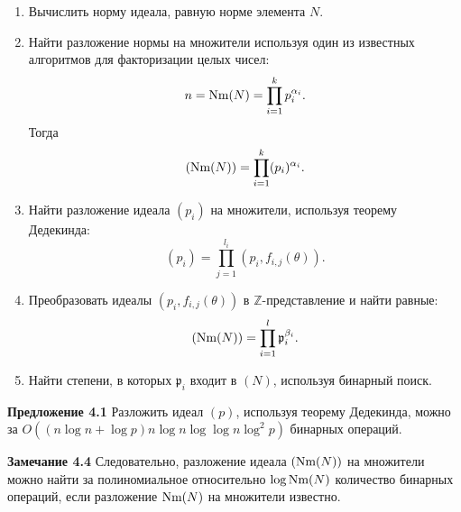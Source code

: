 \documentclass[_00_autoref.tex]{subfiles}
\begin{document}
    \begin{enumerate}        
        \item Вычислить норму идеала, равную норме элемента $N$.
        
        \item Найти разложение нормы на множители используя один из известных алгоритмов для факторизации целых чисел:
        \begin{equation*}
            n = \textrm{Nm}(N) = \prod_{i=1}^{k} p_i^{\alpha_i}.
        \end{equation*}
        Тогда
        \begin{equation*}
            (\textrm{Nm}(N)) = \prod_{i=1}^{k} (p_i)^{\alpha_i}.
        \end{equation*}
    
        \item Найти разложение идеала $(p_i)$ на множители, используя теорему Дедекинда:
        \begin{equation*}
            (p_i) = \prod_{j=1}^{l_i} (p_i, f_{i, j}(\theta)).
        \end{equation*}
    
        \item Преобразовать идеалы $(p_i, f_{i, j}(\theta))$ в $\mathbb{Z}$-представление и найти равные:
        \begin{equation*}
            (\textrm{Nm}(N)) = \prod_{i=1}^{l} \mathfrak{p}_i^{\beta_i}.
        \end{equation*}
    
        \item Найти степени, в которых $\mathfrak{p}_i$ входит в $(N)$, используя бинарный поиск.
    \end{enumerate}

\textbf{Предложение 4.1}
    Разложить идеал $(p)$, используя теорему Дедекинда, можно за $O((n\log n + \log p)n\log n\log\log n\log^2 p)$ бинарных операций.

\textbf{Замечание 4.4}
    Следовательно, разложение идеала $(\textrm{Nm}(N))$ на множители можно найти за полиномиальное относительно $\log\textrm{Nm}(N)$ количество бинарных операций, если разложение $\textrm{Nm}(N)$ на множители известно.
\end{document}
